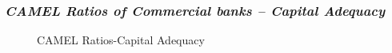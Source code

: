\documentclass[
  12pt,
  a4paper,
]{scrreprt}
\begin{document}
{{{{\subsubsection{\texorpdfstring{\emph{CAMEL Ratios of Commercial banks --
Capital
Adequacy}}{CAMEL Ratios of Commercial banks -- Capital Adequacy}}\label{camel-ratios-of-commercial-banks-capital-adequacy}

\begin{figure}


\caption{\label{fig-CAMELcapital}CAMEL Ratios-Capital Adequacy}

\end{figure}%

\begin{figure}

\end{figure}}}}}
\end{document}
